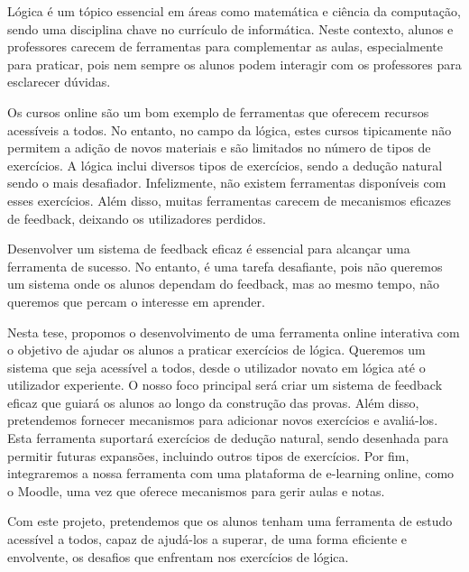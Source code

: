 
%


Lógica é um tópico essencial em áreas como matemática e ciência da computação, sendo uma disciplina chave no currículo de informática. Neste contexto, alunos e professores carecem de ferramentas para complementar as aulas, especialmente para praticar, pois nem sempre os alunos podem interagir com os professores para esclarecer dúvidas.

Os cursos online são um bom exemplo de ferramentas que oferecem recursos acessíveis a todos. No entanto, no campo da lógica, estes cursos tipicamente não permitem a adição de novos materiais e são limitados no número de tipos de exercícios. A lógica inclui diversos tipos de exercícios, sendo a dedução natural sendo o mais desafiador. Infelizmente, não existem ferramentas disponíveis com esses exercícios. Além disso, muitas ferramentas carecem de mecanismos eficazes de feedback, deixando os utilizadores perdidos.

Desenvolver um sistema de feedback eficaz é essencial para alcançar uma ferramenta de sucesso. No entanto, é uma tarefa desafiante, pois não queremos um sistema onde os alunos dependam do feedback, mas ao mesmo tempo, não queremos que percam o interesse em aprender.

Nesta tese, propomos o desenvolvimento de uma ferramenta online interativa com o objetivo de ajudar os alunos a praticar exercícios de lógica. Queremos um sistema que seja acessível a todos, desde o utilizador novato em lógica até o utilizador experiente. O nosso foco principal será criar um sistema de feedback eficaz que guiará os alunos ao longo da construção das provas. Além disso, pretendemos fornecer mecanismos para adicionar novos exercícios e avaliá-los. Esta ferramenta suportará exercícios de dedução natural, sendo desenhada para permitir futuras expansões, incluindo outros tipos de exercícios. Por fim, integraremos a nossa ferramenta com uma plataforma de e-learning online, como o Moodle, uma vez que oferece mecanismos para gerir aulas e notas.

Com este projeto, pretendemos que os alunos tenham uma ferramenta de estudo acessível a todos, capaz de ajudá-los a superar, de uma forma eficiente e envolvente, os desafios que enfrentam nos exercícios de lógica.

